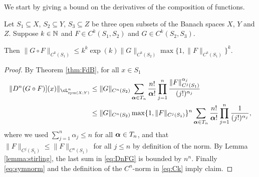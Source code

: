 We start by giving a bound on the derivatives of the composition of
functions.

\begin{corollary}\label{cor:composition}
  Let $S_1\subseteq X$, $S_2\subseteq Y$, $S_3\subseteq Z$ be three
  open subsets of the Banach spaces $X$, $Y$ and $Z$.
  Suppose $k\in\mathbb{N}$ and
  $F\in C^k(S_1,S_2)$ and $G\in C^k(S_2,S_3)$.

  Then $\|G\circ F\|_{C^k(S_1)}\le k^k\exp(k)\|G\|_{C^k(S_2)}
  \max\{1,\|F\|_{C^k(S_1)}\}^k$.
  \end{corollary}
  \begin{proof}
    By Theorem \ref{thm:FdB}, for all $x\in S_1$
    \begin{align}\label{eq:DnFG}
    \|D^n(G\circ F)](x)\|_{\cL^n_{\sym(X;Y)}}
    &\le
      \|G\|_{C^n(S_2)}
      \sum_{\bsalpha\in T_n}
      \frac{n!}{\bsalpha!}
      \prod_{j=1}^n \frac{\|F\|_{C^j(S_1)}^{\alpha_j}}{(j!)^{\alpha_j}}\nonumber\\
    &\le
      \|G\|_{C^n(S_2)}\max\{1,\|F\|_{C^j(S_1)}\}^n
      \sum_{\bsalpha\in T_n}
      \frac{n!}{\bsalpha!}\prod_{j=1}^n\frac{1}{(j!)^{\alpha_j}},
  \end{align}
  where we used $\sum_{j=1}^n \alpha_j\le n$ for all
  ${\boldsymbol \alpha}\in T_n$, and that $\|F\|_{C^j(S_1)}\le\|F\|_{C^n(S_1)}$
  for all $j\le n$ by definition of the norm.
  By Lemma \ref{lemma:stirling}, the last sum in \eqref{eq:DnFG} is
  bounded by $n^n$. Finally \eqref{eq:symnorm} and the definition
  of the $C^n$-norm in \eqref{eq:Ck} imply claim.
\end{proof}



